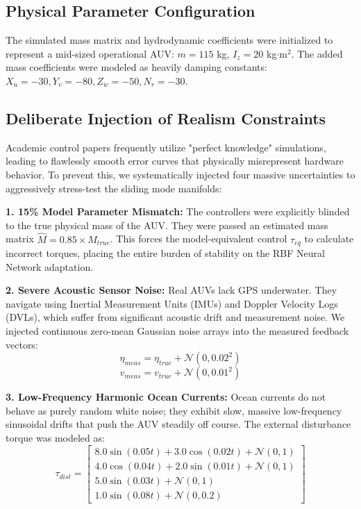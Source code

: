 \documentclass[conference]{IEEEtran}
\begin{document}
\subsection{Physical Parameter Configuration}
The simulated mass matrix and hydrodynamic coefficients were initialized to represent a mid-sized operational AUV:
$m = 115$ kg, $I_z = 20$ kg$\cdot$m$^2$. The added mass coefficients were modeled as heavily damping constants: $X_{\dot{u}} = -30, Y_{\dot{v}} = -80, Z_{\dot{w}} = -50, N_{\dot{r}} = -30$. 

\subsection{Deliberate Injection of Realism Constraints}
Academic control papers frequently utilize "perfect knowledge" simulations, leading to flawlessly smooth error curves that physically misrepresent hardware behavior. To prevent this, we systematically injected four massive uncertainties to aggressively stress-test the sliding mode manifolds:

\textbf{1. 15\% Model Parameter Mismatch:} The controllers were explicitly blinded to the true physical mass of the AUV. They were passed an estimated mass matrix $\hat{M} = 0.85 \times M_{true}$. This forces the model-equivalent control $\tau_{eq}$ to calculate incorrect torques, placing the entire burden of stability on the RBF Neural Network adaptation.

\textbf{2. Severe Acoustic Sensor Noise:} Real AUVs lack GPS underwater. They navigate using Inertial Measurement Units (IMUs) and Doppler Velocity Logs (DVLs), which suffer from significant acoustic drift and measurement noise. We injected continuous zero-mean Gaussian noise arrays into the measured feedback vectors:
\begin{equation}
\eta_{meas} = \eta_{true} + \mathcal{N}(0, 0.02^2)
\end{equation}
\begin{equation}
v_{meas} = v_{true} + \mathcal{N}(0, 0.01^2)
\end{equation}

\textbf{3. Low-Frequency Harmonic Ocean Currents:} Ocean currents do not behave as purely random white noise; they exhibit slow, massive low-frequency sinusoidal drifts that push the AUV steadily off course. The external disturbance torque was modeled as:
\begin{equation}
\tau_{dist} = 
\begin{bmatrix}
8.0 \sin(0.05t) + 3.0 \cos(0.02t) + \mathcal{N}(0,1) \\
4.0 \cos(0.04t) + 2.0 \sin(0.01t) + \mathcal{N}(0,1) \\
5.0 \sin(0.03t) + \mathcal{N}(0,1) \\
1.0 \sin(0.08t) + \mathcal{N}(0,0.2)
\end{bmatrix}
\end{equation}
\end{document}
